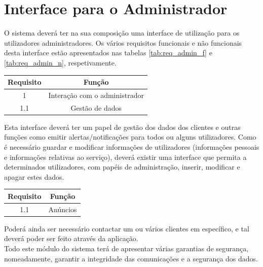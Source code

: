 \section{Interface para o Administrador} \label{sec:req_admin}
O sistema deverá ter na sua composição uma interface de utilização para os utilizadores administradores. Os vários requisitos funcionais e não funcionais desta interface estão apresentados nas tabelas \ref{tab:req_admin_f} e \ref{tab:req_admin_n}, respetivamente.

\begin{center}
\begin{tabular}[c]{||c c||} 
\hline
Requisito & Função\\
\hline
1 & Interação com o administrador\\ 

1.1 & Gestão de dados\\

\hline
\end{tabular}
\label{tab:req_admin_f}
\end{center}
\vspace{8mm} %

Esta interface deverá ter um papel de gestão dos dados dos clientes e outras funções como emitir alertas/notificações para todos ou alguns utilizadores. Como é necessário guardar e modificar informações de utilizadores (informações pessoais e informações relativas ao serviço), deverá existir uma interface que permita a determinados utilizadores, com papéis de administração, inserir, modificar e apagar estes dados.

\begin{center}
\begin{tabular}[c]{||c c||} 
\hline
Requisito & Função\\
\hline
1.1 & Anúncios\\
\hline
\end{tabular}
\label{tab:req_admin_n}
\end{center}

Poderá ainda ser necessário contactar um ou vários clientes em específico, e tal deverá poder ser feito através da aplicação.\\
Todo este módulo do sistema terá de apresentar várias garantias de segurança, nomeadamente, garantir a integridade das comunicações e a segurança dos dados.

